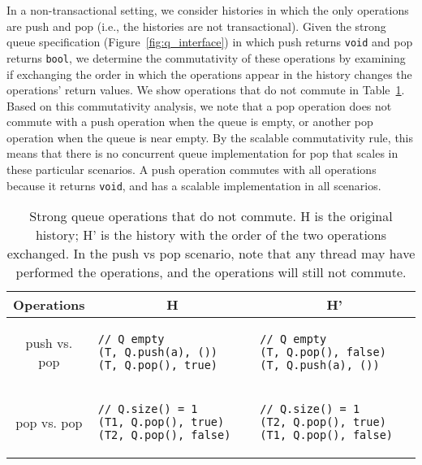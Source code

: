 In a non-transactional setting, we consider histories in which the only operations are push and pop (i.e., the histories are not transactional). Given the strong queue specification (Figure~\ref{fig:q_interface}) in which push returns \texttt{void} and pop returns \texttt{bool}, we determine the commutativity of these operations by examining if exchanging the order in which the operations appear in the history changes the operations' return values. We show operations that do not commute in Table~\ref{tab:strongq_commute}.
Based on this commutativity analysis, we note that a pop operation does not commute with a push operation when the queue is empty, or another pop operation when the queue is near empty. By the scalable commutativity rule, this means that there is no concurrent queue implementation for pop that scales in these particular scenarios. A push operation commutes with all operations because it returns \texttt{void}, and has a scalable implementation in all scenarios.

\begin{table}[t]
    \singlespace
    \centering
    \begin{tabular}{|c|l|l|}
        \hline
        Operations & \multicolumn{1}{c}{H} & \multicolumn{1}{|c|}{H'} \\
        \hline
    
        push vs. pop &
\begin{lstlisting}
// Q empty
(T, Q.push(a), ())                       
(T, Q.pop(), true)
\end{lstlisting} &
\begin{lstlisting}
// Q empty
(T, Q.pop(), false)
(T, Q.push(a), ())                       
\end{lstlisting}\\
\hline

    pop vs. pop &
\begin{lstlisting}
// Q.size() = 1
(T1, Q.pop(), true)
(T2, Q.pop(), false)                       
\end{lstlisting} &
\begin{lstlisting}
// Q.size() = 1
(T2, Q.pop(), true)
(T1, Q.pop(), false)                       
\end{lstlisting}\\
    \hline

    \end{tabular}
    \caption[Strong queue operations that do not commute]{Strong queue operations that do not commute. H is the original history; H' is the history with the order of the two operations exchanged. In the push vs pop scenario, note that any thread may have performed the operations, and the operations will still not commute.}
    \label{tab:strongq_commute}
    \end{table}


